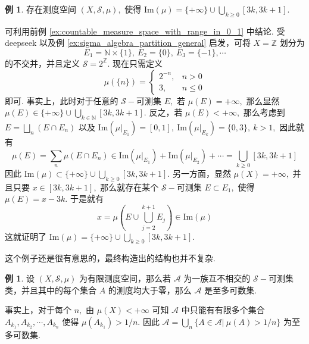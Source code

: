 \documentclass[12pt, a4paper, oneside]{book}
\numberwithin{figure}{section}
\theoremstyle{definition}
\newtheorem{example}[theorem]{例}
\begin{document}
\begin{example}
    存在测度空间 $(X,\mathcal S,\mu),$ 使得 $\mathrm{Im}(\mu)=\{+\infty\}\cup\bigcup_{k\geq 0}[3k,3k+1].$
\end{example}

可利用前例 \ref{ex:countable_measure_space_with_range_in_0_1} 中结论. 
受 deepseek 以及例 \ref{ex:sigma_algebra_partition_general} 启发，可将 $X=\mathbb Z$ 划分为 
\begin{equation}
    E_1=\mathbb N\times\{1\},\ E_2=\{0\},\ E_3=\{-1\},\cdots
\end{equation}
的不交并，并且定义 $\mathcal S=2^{\mathbb Z}.$ 
现在只需定义
\begin{equation}
    \mu(\{n\}) = \begin{cases}
        2^{-n},&n>0\\
        3,&n\leq 0
    \end{cases}
\end{equation}
即可.  事实上，此时对于任意的 $\mathcal S-$可测集 $E,$ 若 $\mu(E)=+\infty,$ 那么显然 $\mu(E)\in \{+\infty\}\cup\bigcup_{k\in\mathbb N}[3k,3k+1].$ 
反之，若 $\mu(E)<+\infty,$ 那么考虑到 $E=\bigsqcup_{n} (E\cap E_n)$ 以及 $\mathrm{Im}(\mu|_{E_1})=[0,1],\ \mathrm{Im}(\mu|_{E_k})=\{0,3\},\ k>1,$ 
因此就有 
\begin{equation}
    \mu(E) = \sum_n \mu(E\cap E_n)\in \mathrm{Im}(\mu|_{E_1})+\mathrm{Im}(\mu|_{E_{2}})+\cdots = \bigcup_{k\geq 0}[3k,3k+1]
\end{equation}
因此 $\mathrm{Im}(\mu)\subset\{+\infty\}\cup\bigcup_{k\geq 0}[3k,3k+1].$ 另一方面，显然 $\mu(X)=+\infty,$ 并且只要 $x\in [3k,3k+1],$ 
那么就存在某个 $\mathcal S-$可测集 $E\subset E_1,$ 使得 $\mu(E)=x-3k.$ 于是就有
\begin{equation}
    x = \mu\left(E\cup \bigcup_{j=2}^{k+1} E_j\right)\in\mathrm{Im}(\mu)
\end{equation}
这就证明了 $\mathrm{Im}(\mu)=\{+\infty\}\cup\bigcup_{k\geq 0}[3k,3k+1].$ 

这个例子还是很有意思的，最终构造出的结构也并不复杂.

\begin{example}
    设 $(X,\mathcal S,\mu)$ 为有限测度空间，那么若 $\mathcal A$ 为一族互不相交的 $\mathcal S-$可测集类，并且其中的每个集合 $A$ 的测度均大于零，那么 $\mathcal A$ 是至多可数集.
\end{example}

事实上，对于每个 $n,$ 由 $\mu(X)<+\infty$ 可知 $\mathcal A$ 中只能有有限多个集合 $A_{k_1},A_{k_2},\cdots,A_{k_n}$ 使得 $\mu(A_{k_1})>1/n.$ 因此 $\mathcal A=\bigcup_{n}\{A\in\mathcal A|\ \mu(A)>1/n\}$ 为至多可数集.
\end{document}

